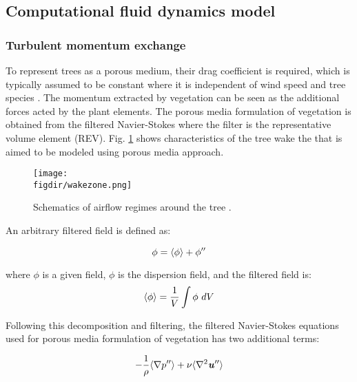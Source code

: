 \subsection{Computational fluid dynamics model}

\subsubsection*{Turbulent momentum exchange}

To represent trees as a porous medium, their drag coefficient is required, which is typically assumed to be constant where it is independent of wind speed and tree species \citep{Wilson1977}. The momentum extracted by vegetation can be seen as the additional forces acted by the plant elements. The porous media formulation of vegetation is obtained from the filtered Navier-Stokes where the filter is the representative volume element (REV). Fig. \ref{fig:wakezone} shows characteristics of the tree wake the that is aimed to be modeled using porous media approach. 

\begin{figure}[t]
	\centering
	\texttt{[image: \\figdir/wakezone.png]}
	\caption{Schematics of airflow regimes around the tree \citep{Cleugh1998,Judd1996}.}
	\label{fig:wakezone}
\end{figure}

An arbitrary filtered field is defined as:

\begin{equation}
\phi = \langle \phi \rangle + \phi''
\end{equation}

where $\phi$ is a given field,  $\phi$ is the dispersion field, and the filtered field is:
\begin{equation}
\eavg{\phi} = \frac{1}{V} \int \phi\ dV 
\end{equation}

Following this decomposition and filtering, the filtered Navier-Stokes equations used for porous media formulation of vegetation has two additional terms:

\begin{equation}
-\frac{1}{\rho}\langle \nabla p'' \rangle + \nu \langle \nabla^2 \textbf{\textit{u}}'' \rangle
\end{equation}

